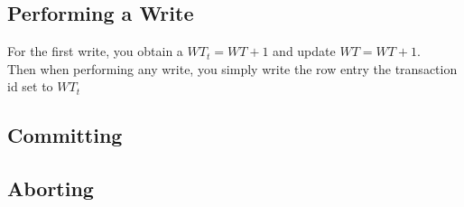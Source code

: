 \documentclass[a4paper, 11pt]{article}
\begin{document}
\subsection{Performing a Write}
For the first write, you obtain a $WT_t = WT + 1$ and update $WT = WT + 1$. \\
Then when performing any write, you simply write the row entry the transaction id set to $WT_t$

\subsection{Committing}

\subsection{Aborting}
\end{document}
